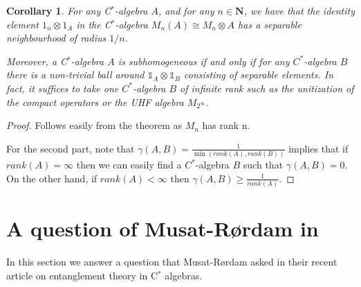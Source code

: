 \documentclass[11pt]{article}
\numberwithin{theorem}{section}
\newtheorem{corollary}[theorem]{Corollary}
\begin{document}
\begin{corollary}
    For any C$^*$-algebra $A$, and for any $n\in \mathbf{N}$, we have that the identity element $1_n\otimes 1_A$ in the  C$^*$-algebra $M_n(A)\cong M_n\otimes A$ has a separable neighbourhood of radius $1/n$.

    Moreover, a C$^{\ast}$-algebra $A$ is subhomogeneous if and only if for any $C^{\ast}$-algebra $B$ there is a non-trivial ball around $\mathds{1}_{A}\otimes \mathds{1}_{B}$ consisting of separable elements. In fact, it suffices to take one $C^{\ast}$-algebra $B$ of infinite rank such as the unitization of the compact operators or the UHF algebra $M_{2^{\infty}}$.
\end{corollary}
\begin{proof}
    Follows easily from the theorem as $M_n$ has rank n.

    For the second part, note that $\gamma(A,B) = \frac{1}{\min(rank(A), rank(B))}$ implies that if $rank(A) = \infty$ then we can easily find a $C^{\ast}$-algebra $B$ such that $\gamma(A,B) = 0$. On the other hand, if $rank(A)<\infty$ then $\gamma(A,B) \geqslant \frac{1}{rank(A)}$.
\end{proof}


\section{A question of Musat-R{\o}rdam in \cite{MusatRordam}}
In this section we answer a question that Musat-R{\o}rdam asked in their recent article on entanglement theory in C$^*$ algebras.
\end{document}

